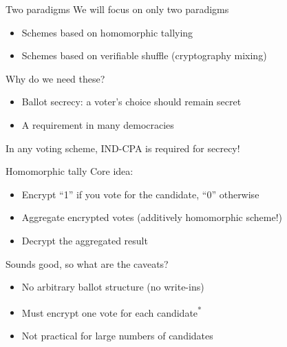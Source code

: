 \begin{frame}{Two paradigms}
  We will focus on only two paradigms
  \begin{itemize}[<+(1)->]
    \item Schemes based on homomorphic tallying
    \item Schemes based on verifiable shuffle (cryptography mixing)
  \end{itemize}

  \vspace*{1em}

  \pause
  Why do we need these?
  \begin{itemize}[<+(1)->]
    \item Ballot secrecy: a voter's choice should remain secret
    \item A requirement in many democracies
  \end{itemize}

  \vspace*{1em}

  \pause
  In any voting scheme, IND-CPA is required for secrecy!
\end{frame}

\begin{frame}{Homomorphic tally}
  Core idea:
  \begin{itemize}[<+(1)->]
    \item Encrypt \enquote{1} if you vote for the candidate, \enquote{0} otherwise
    \item Aggregate encrypted votes (additively homomorphic scheme!)
    \item Decrypt the aggregated result
  \end{itemize}

  \vspace*{1em}

  \pause
  Sounds good, so what are the caveats?
  \begin{itemize}[<+(1)->]
    \item No arbitrary ballot structure (no write-ins)
    \item Must encrypt one vote for each candidate\textsuperscript{*}
    \item Not practical for large numbers of candidates
  \end{itemize}
\end{frame}

